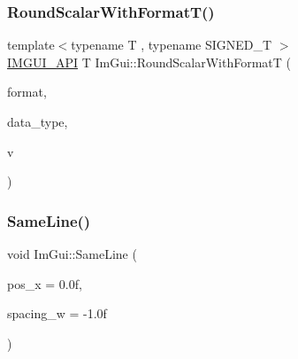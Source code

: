 \subsubsection{\texorpdfstring{Round\+Scalar\+With\+Format\+T()}{RoundScalarWithFormatT()}}
{\footnotesize\ttfamily template$<$typename T , typename S\+I\+G\+N\+E\+D\+\_\+T $>$ \\
\mbox{\hyperlink{imgui_8h_a43829975e84e45d1149597467a14bbf5}{I\+M\+G\+U\+I\+\_\+\+A\+PI}} T Im\+Gui\+::\+Round\+Scalar\+With\+FormatT (\begin{DoxyParamCaption}\item[{const char $\ast$}]{format,  }\item[{\mbox{\hyperlink{imgui_8h_a4cfa8697a3d76722fff83eb18922e9d5}{Im\+Gui\+Data\+Type}}}]{data\+\_\+type,  }\item[{T}]{v }\end{DoxyParamCaption})}

\mbox{\label{namespace_im_gui_a9a01bed1445b5b7edaf0af6a31c08d2c}} 
\subsubsection{\texorpdfstring{Same\+Line()}{SameLine()}}
{\footnotesize\ttfamily void Im\+Gui\+::\+Same\+Line (\begin{DoxyParamCaption}\item[{float}]{pos\+\_\+x = {\ttfamily 0.0f},  }\item[{float}]{spacing\+\_\+w = {\ttfamily -\/1.0f} }\end{DoxyParamCaption})}


